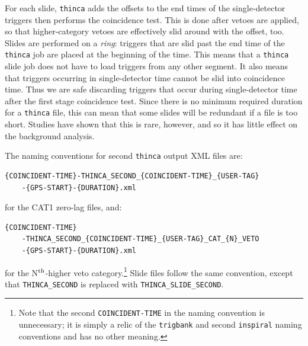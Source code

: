 For each slide, \texttt{thinca} adds the offsets to the end times of the
single-detector triggers then performs the coincidence test. This is done after
vetoes are applied, so that higher-category vetoes are effectively slid around
with the offset, too. Slides are performed on a \emph{ring}: triggers that are
slid past the end time of the \texttt{thinca} job are placed at the beginning
of the time. This means that a \texttt{thinca} slide job does not have to load
triggers from any other segment. It also means that triggers occurring in
single-detector time cannot be slid into coincidence time. Thus we are safe
discarding triggers that occur during single-detector time after the first
stage coincidence test. Since there is no minimum required duration for a
\texttt{thinca} file, this can mean that some slides will be redundant if a
file is too short. Studies have shown that this is rare, however, and so it has
little effect on the background analysis.

The naming conventions for second \texttt{thinca} output XML files are:
\begin{verbatim}
{COINCIDENT-TIME}-THINCA_SECOND_{COINCIDENT-TIME}_{USER-TAG}
    -{GPS-START}-{DURATION}.xml
\end{verbatim}
for the CAT1 zero-lag files, and:
\begin{verbatim}
{COINCIDENT-TIME}
    -THINCA_SECOND_{COINCIDENT-TIME}_{USER-TAG}_CAT_{N}_VETO
    -{GPS-START}-{DURATION}.xml
\end{verbatim}
for the N$^{\mathrm{th}}$-higher veto category.\footnote{Note that the second
\texttt{COINCIDENT-TIME} in the naming convention is unnecessary; it is simply a relic
of the \texttt{trigbank} and second \texttt{inspiral} naming conventions and
has no other meaning.} Slide files follow the same convention, except that
\texttt{THINCA\_SECOND} is replaced with \texttt{THINCA\_SLIDE\_SECOND}.

